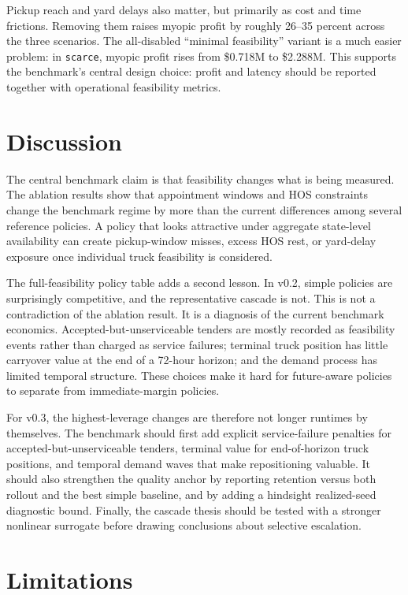 \documentclass[11pt]{article}
\begin{document}
Pickup reach and yard delays also matter, but primarily as cost and time
frictions. Removing them raises myopic profit by roughly 26--35 percent across
the three scenarios. The all-disabled ``minimal feasibility'' variant is a much
easier problem: in \texttt{scarce}, myopic profit rises from \$0.718M to
\$2.288M. This supports the benchmark's central design choice: profit and
latency should be reported together with operational feasibility metrics.

\section{Discussion}

The central benchmark claim is that feasibility changes what is being measured.
The ablation results show that appointment windows and HOS constraints change
the benchmark regime by more than the current differences among several
reference policies. A policy that looks attractive under aggregate state-level
availability can create pickup-window misses, excess HOS rest, or yard-delay
exposure once individual truck feasibility is considered.

The full-feasibility policy table adds a second lesson. In v0.2, simple
policies are surprisingly competitive, and the representative cascade is not.
This is not a contradiction of the ablation result. It is a diagnosis of the
current benchmark economics. Accepted-but-unserviceable tenders are mostly
recorded as feasibility events rather than charged as service failures;
terminal truck position has little carryover value at the end of a 72-hour
horizon; and the demand process has limited temporal structure. These choices
make it hard for future-aware policies to separate from immediate-margin
policies.

For v0.3, the highest-leverage changes are therefore not longer runtimes by
themselves. The benchmark should first add explicit service-failure penalties
for accepted-but-unserviceable tenders, terminal value for end-of-horizon truck
positions, and temporal demand waves that make repositioning valuable. It
should also strengthen the quality anchor by reporting retention versus both
rollout and the best simple baseline, and by adding a hindsight realized-seed
diagnostic bound. Finally, the cascade thesis should be tested with a stronger
nonlinear surrogate before drawing conclusions about selective escalation.

\section{Limitations}
\end{document}
